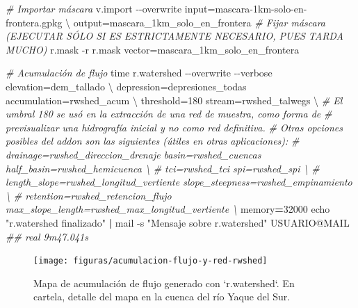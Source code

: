 \documentclass[spanish]{article}
\newenvironment{Shaded}{\begin{snugshade}}{\end{snugshade}}
\newcommand{\AttributeTok}[1]{\textcolor[rgb]{0.77,0.63,0.00}{#1}}
\newcommand{\BuiltInTok}[1]{#1}
\newcommand{\CommentTok}[1]{\textcolor[rgb]{0.56,0.35,0.01}{\textit{#1}}}
\newcommand{\DataTypeTok}[1]{\textcolor[rgb]{0.13,0.29,0.53}{#1}}
\newcommand{\ExtensionTok}[1]{#1}
\newcommand{\KeywordTok}[1]{\textcolor[rgb]{0.13,0.29,0.53}{\textbf{#1}}}
\newcommand{\NormalTok}[1]{#1}
\newcommand{\OperatorTok}[1]{\textcolor[rgb]{0.81,0.36,0.00}{\textbf{#1}}}
\newcommand{\StringTok}[1]{\textcolor[rgb]{0.31,0.60,0.02}{#1}}
\newcommand{\VariableTok}[1]{\textcolor[rgb]{0.00,0.00,0.00}{#1}}
\begin{document}
\begin{Shaded}
\begin{Highlighting}[]
\CommentTok{\# Importar máscara}
\ExtensionTok{v.import} \AttributeTok{{-}{-}overwrite}\NormalTok{ input=mascara{-}1km{-}solo{-}en{-}frontera.gpkg }\DataTypeTok{\textbackslash{}}
\NormalTok{  output=mascara\_1km\_solo\_en\_frontera}
\CommentTok{\# Fijar máscara (EJECUTAR SÓLO SI ES ESTRICTAMENTE NECESARIO, PUES TARDA MUCHO)}
\ExtensionTok{r.mask} \AttributeTok{{-}r}
\ExtensionTok{r.mask}\NormalTok{ vector=mascara\_1km\_solo\_en\_frontera}

\CommentTok{\# Acumulación de flujo}
\BuiltInTok{time}\NormalTok{ r.watershed }\AttributeTok{{-}{-}overwrite} \AttributeTok{{-}{-}verbose}\NormalTok{ elevation=dem\_tallado }\DataTypeTok{\textbackslash{}}
\NormalTok{ depression=depresiones\_todas accumulation=rwshed\_acum }\DataTypeTok{\textbackslash{}}
\NormalTok{ threshold=180 stream=rwshed\_talwegs }\DataTypeTok{\textbackslash{}}
 \CommentTok{\# El umbral 180 se usó en la extracción de una red de muestra, como forma de}
 \CommentTok{\# previsualizar una hidrografía inicial y no como red definitiva.}
 \CommentTok{\# Otras opciones posibles del addon son las siguientes (útiles en otras aplicaciones):}
 \CommentTok{\# drainage=rwshed\_direccion\_drenaje basin=rwshed\_cuencas half\_basin=rwshed\_hemicuenca \textbackslash{}}
 \CommentTok{\# tci=rwshed\_tci spi=rwshed\_spi \textbackslash{}}
 \CommentTok{\# length\_slope=rwshed\_longitud\_vertiente slope\_steepness=rwshed\_empinamiento \textbackslash{}}
 \CommentTok{\# retention=rwshed\_retencion\_flujo max\_slope\_length=rwshed\_max\_longitud\_vertiente \textbackslash{}}
 \VariableTok{memory}\OperatorTok{=}\NormalTok{32000}
\BuiltInTok{echo} \StringTok{"r.watershed finalizado"} \KeywordTok{|} \ExtensionTok{mail} \AttributeTok{{-}s} \StringTok{"Mensaje sobre r.watershed"}\NormalTok{ USUARIO@MAIL}
\CommentTok{\#\# real 9m47.041s}
\end{Highlighting}
\end{Shaded}

\begin{figure}

{\centering \texttt{[image: figuras/acumulacion-flujo-y-red-rwshed]} 

}

\caption{Mapa de acumulación de flujo generado con `r.watershed`. En cartela, detalle del mapa en la cuenca del río Yaque del Sur.}\label{fig:acumyredrwshed}
\end{figure}
\end{document}
